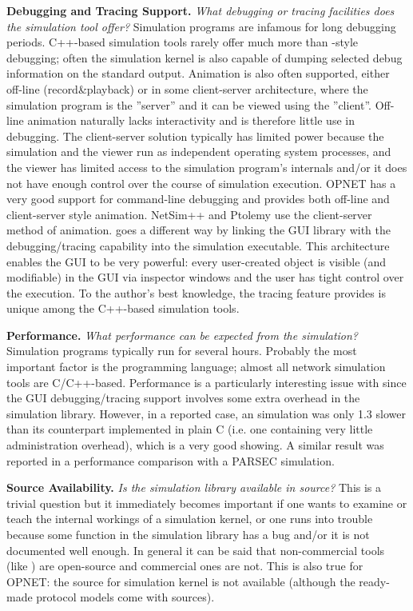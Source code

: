 \textbf{Debugging and Tracing Support.} \textit{What debugging or tracing
facilities does the simulation tool offer?} Simulation programs
are infamous for long debugging periods. C++-based simulation
tools rarely offer much more than -style debugging; often
the simulation kernel is also capable of dumping selected debug
information on the standard output. Animation is also often supported,
either off-line (record\&playback) or in some client-server architecture,
where the simulation program is the ''server'' and
it can be viewed using the ''client''. Off-line animation
naturally lacks interactivity and is therefore little use in
debugging. The client-server solution typically has limited power
because the simulation and the viewer run as independent operating
system processes, and the viewer has limited access to the simulation
program's internals and/or it does not have enough control over
the course of simulation execution. OPNET has a very good support
for command-line debugging and provides both off-line and client-server
style animation. NetSim++ and Ptolemy use the client-server method
of animation. {\opp} goes a different way by linking the GUI
library with the debugging/tracing capability into the simulation
executable. This architecture enables the GUI to be very powerful:
every user-created object is visible (and modifiable) in the
GUI via inspector windows and the user has tight control over
the execution. To the author's best knowledge, the tracing feature
{\opp} provides is unique among the C++-based simulation tools.


\textbf{Performance.} \textit{What performance can be expected from the
simulation?} Simulation programs typically run for several hours.
Probably the most important factor is the programming language;
almost all network simulation tools are C/C++-based. Performance
is a particularly interesting issue with {\opp} since the GUI
debugging/tracing support involves some extra overhead in the
simulation library. However, in a reported case, an {\opp} simulation
was only 1.3 slower than its counterpart implemented in plain
C (i.e. one containing very little administration overhead),
which is a very good showing. A similar result was reported in
a performance comparison with a PARSEC simulation.


\textbf{Source Availability.} \textit{Is the simulation library available
in source?} This is a trivial question but it immediately becomes
important if one wants to examine or teach the internal workings
of a simulation kernel, or one runs into trouble because some
function in the simulation library has a bug and/or it is not
documented well enough. In general it can be said that non-commercial
tools (like {\opp}) are open-source and commercial ones are
not. This is also true for OPNET: the source for simulation kernel
is not available (although the ready-made protocol models come
with sources).


